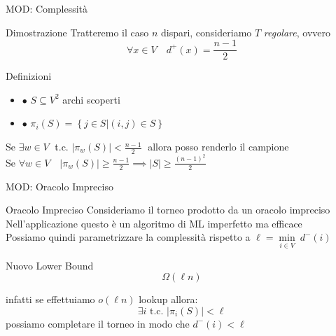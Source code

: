 \documentclass{beamer}
\begin{document}
\begin{frame}{MOD: Complessità}
	\begin{block}{Dimostrazione}
		Tratteremo il caso $n$ dispari, consideriamo $T$ \textit{regolare}, ovvero
		$$ \forall x \in V \quad d^+(x) = \frac{n-1}{2} $$
		\pause
		\begin{center}
			\begin{minipage}{.7 \textwidth}
				\begin{block}{Definizioni}
					\begin{itemize}
						\item $\bullet$ $S \subseteq V^2$ archi scoperti
						\item $\bullet$ $\pi_i(S) = \left\{j \in S \big| (i, j) \in S \right\}$
					\end{itemize}
				\end{block}
			\end{minipage}
		\end{center}

		\pause
		Se $\exists w \in V\;$ t.c. $\left|\pi_w(S)\right| < \frac{n-1}{2}\;$ allora posso renderlo il campione \\
		\vspace{3mm}
		Se $\forall w \in V \quad \left|\pi_w(S)\right| \geq \frac{n-1}{2} \implies \left|S\right| \geq \frac{(n-1)^2}{2}$
	\end{block}
\end{frame}

\begin{frame}{MOD: Oracolo Impreciso}
	\begin{block}{Oracolo Impreciso}
		Consideriamo il torneo prodotto da un oracolo impreciso \\
		\vspace{3mm}
		Nell'applicazione questo è un algoritmo di ML imperfetto ma efficace \\
		\vspace{3mm}
		Possiamo quindi parametrizzare la complessità rispetto a $\ell = \min\limits_{i \in V} \:d^-\left(i\right)$ \\
	\end{block}
	\pause
	\begin{block}{Nuovo Lower Bound}
		$$ \Omega\left(\ell n\right) $$

		infatti se effettuiamo $o(\ell n)$ lookup allora:
		$$ \exists i \text{ t.c. } \big|\pi_i(S)\big| < \ell $$
		possiamo completare il torneo in modo che $ d^-(i) < \ell $

	\end{block}

\end{frame}
\end{document}
